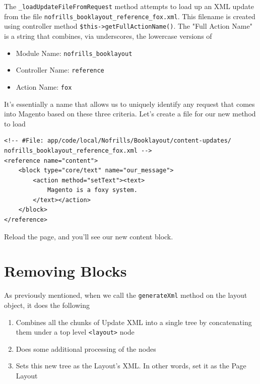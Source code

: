 \documentclass[oneside]{book}
\begin{document}
The \footnotesize\texttt{\_loadUpdateFileFromRequest} \normalsize  method attempts to load up an XML update from the file \footnotesize\texttt{nofrills\_booklayout\_reference\_fox.xml}\normalsize.  This filename is created using controller method \footnotesize\texttt{\$this-\textgreater getFullActionName()}\normalsize.  The "Full Action Name" is a string that combines, via underscores, the lowercase versions of

\begin{itemize}
\item Module Name: \footnotesize\texttt{nofrills\_booklayout} \normalsize
\item Controller Name: \footnotesize\texttt{reference} \normalsize
\item Action Name: \footnotesize\texttt{fox} \normalsize
\end{itemize}


It's essentially a name that allows us to uniquely identify any request that comes into Magento based on these three criteria.  Let's create a file for our new method to load

\begin{lstlisting}
<!-- #File: app/code/local/Nofrills/Booklayout/content-updates/
nofrills_booklayout_reference_fox.xml -->
<reference name="content">
    <block type="core/text" name="our_message">
        <action method="setText"><text>
            Magento is a foxy system.
        </text></action>
    </block>
</reference>

\end{lstlisting}


Reload the page, and you'll see our new content block.

\section{Removing Blocks}

As previously mentioned, when we call the \footnotesize\texttt{generateXml} \normalsize  method on the layout object, it does the following

\begin{enumerate}
\item Combines all the chunks of Update XML into a single tree by concatenating them under a top level \footnotesize\texttt{\textless layout\textgreater } \normalsize  node
\item Does some additional processing of the nodes
\item Sets this new tree as the Layout's XML.  In other words, set it as the Page Layout
\end{enumerate}
\end{document}
